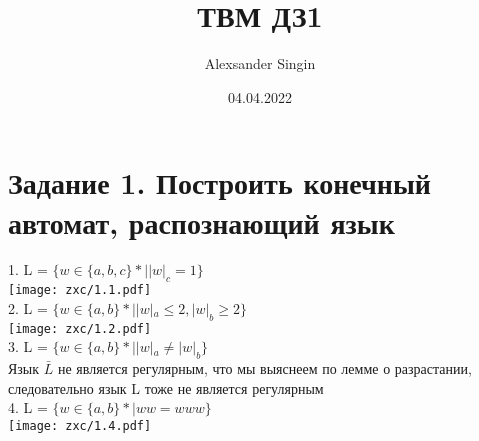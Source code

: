 \documentclass{article}
\title{ТВМ ДЗ1}
\author{Alexsander Singin}
\date{04.04.2022}
\begin{document}
\maketitle
\clearpage	                    
\section{Задание 1. Построить конечный автомат, распознающий язык}
  1. L = $\{w \in \{a,b,c\}*| |w|_c = 1\} $\\
  \texttt{[image: zxc/1.1.pdf]}\\
  2. L = $\{w \in \{a,b\} * | |w|_a \leq 2, |w|_b \geq 2 \}$\\
  \texttt{[image: zxc/1.2.pdf]}\\
  3. L = $\{w \in \{a,b\} * | |w|_a \neq |w|_b \} $\\
  Язык $\bar L$ не является регулярным, что мы выяснеем по лемме о разрастании, следовательно язык L тоже не является регулярным\\
  4. L = $\{w \in \{a,b\} * |ww = www \} $\\
  \texttt{[image: zxc/1.4.pdf]}\\
\end{document}
